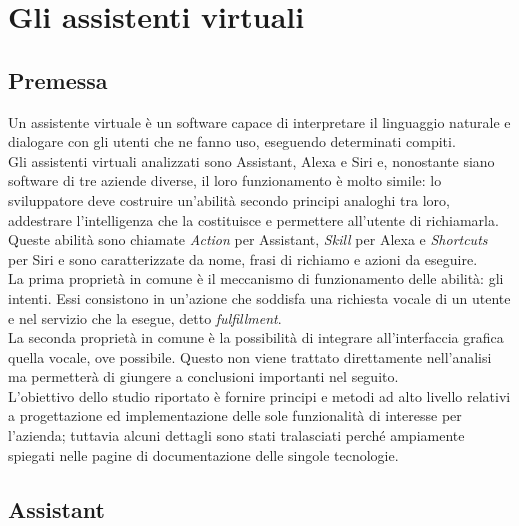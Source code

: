 
\chapter{Gli assistenti virtuali}
\label{cap:assistenti-virtuali}


\section{Premessa}
Un assistente virtuale è un software capace di interpretare il linguaggio naturale e dialogare con gli utenti che ne fanno uso, eseguendo determinati compiti. \\
Gli assistenti virtuali analizzati sono Assistant, Alexa e Siri e, nonostante siano software di tre aziende diverse, il loro funzionamento è molto simile: lo sviluppatore deve costruire un'abilità secondo principi analoghi tra loro, addestrare l'intelligenza che la costituisce e permettere all'utente di richiamarla. Queste abilità sono chiamate \emph{Action} per Assistant, \emph{Skill} per Alexa e \emph{Shortcuts} per Siri e sono caratterizzate da nome, frasi di richiamo e azioni da eseguire. \\
La prima proprietà in comune è il meccanismo di funzionamento delle abilità: gli intenti. Essi consistono in un'azione che soddisfa una richiesta vocale di un utente e nel servizio che la esegue, detto \emph{fulfillment}. \\
La seconda proprietà in comune è la possibilità di integrare all'interfaccia grafica quella vocale, ove possibile. Questo non viene trattato direttamente nell'analisi ma permetterà di giungere a conclusioni importanti nel seguito. \\
L'obiettivo dello studio riportato è fornire principi e metodi ad alto livello relativi a progettazione ed implementazione delle sole funzionalità di interesse per l'azienda; tuttavia alcuni dettagli sono stati tralasciati perché ampiamente spiegati nelle pagine di documentazione delle singole tecnologie.

\section{Assistant}
